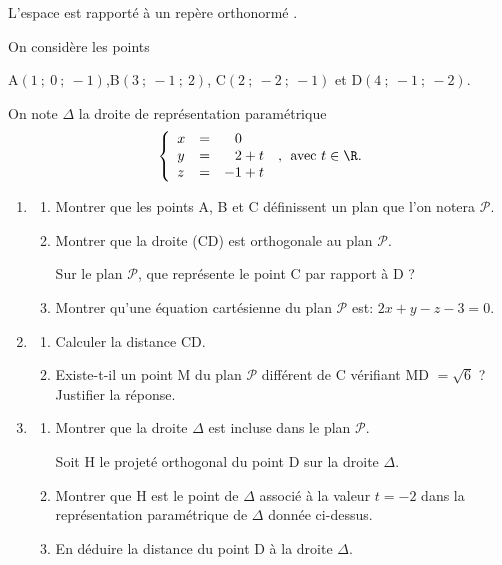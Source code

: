 \medskip

L'espace est rapporté à un repère orthonormé \Oijk.

On considère les points 
\begin{center}A$(1~;~0~;~-1)$,\quad  B$(3~;~-1~;~2)$, \quad C$(2~;~-2~;~ -1)$ \quad et \quad D$(4~;~-1~;~-2)$.\end{center}

On note $\Delta$ la droite de représentation paramétrique 
\[\left\{\begin{array}{l c l}
x &=&\phantom{-}0\\
y &=&\phantom{-}2 + t\\
z &=& -1 + t
\end{array}\right.\:,\:\: \text{avec } t\in \R.\]

\begin{enumerate}
\item 
	\begin{enumerate}
		\item Montrer que les points A, B et C définissent un plan que l'on notera 
$\mathcal{P}$.
		\item Montrer que la droite (CD) est orthogonale au plan $\mathcal{P}$.
		
Sur le plan $\mathcal{P}$, que représente le point C par rapport à D ?
		\item Montrer qu'une équation cartésienne du plan $\mathcal{P}$ est: $2x + y - z - 3 = 0$.
	\end{enumerate}
\item 
	\begin{enumerate}
		\item Calculer la distance CD.
		\item Existe-t-il un point M du plan $\mathcal{P}$ différent de C vérifiant MD $= \sqrt 6$ ? Justifier la réponse.
	\end{enumerate}
\item 
	\begin{enumerate}
		\item Montrer que la droite $\Delta$ est incluse dans le plan $\mathcal{P}$.
		
Soit H le projeté orthogonal du point D sur la droite $\Delta$.
		\item Montrer que H est le point de $\Delta$ associé à la valeur $t = -2$ dans la représentation paramétrique de $\Delta$ donnée ci-dessus.
		\item En déduire la distance du point D à la droite $\Delta$.
	\end{enumerate}
\end{enumerate}

\bigskip
